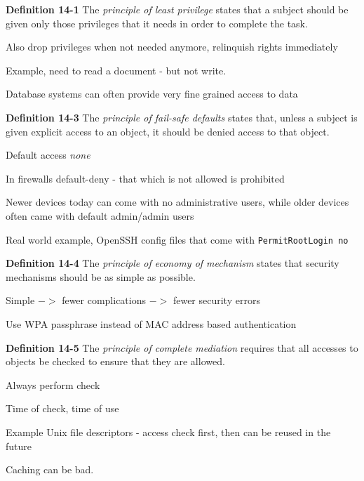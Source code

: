 \documentclass[Screen16to9,17pt]{foils}
\begin{document}

\begin{list1}
\item {\bf Definition 14-1} The \emph{principle of least privilege} states that a subject should be given only those privileges that it needs in order to complete the task.
\item Also drop privileges when not needed anymore, relinquish rights immediately
\item Example, need to read a document - but not write.
\item Database systems can often provide very fine grained access to data
\end{list1}



\begin{list1}
\item {\bf Definition 14-3} The \emph{principle of fail-safe defaults} states that, unless a subject is given explicit access to an object, it should be denied access to that object.
\item Default access \emph{none}
\item In firewalls default-deny - that which is not allowed is prohibited
\item Newer devices today can come with no administrative users, while older devices often came with default admin/admin users
\item Real world example, OpenSSH config files that come with \verb+PermitRootLogin no+
\end{list1}



\begin{list1}
\item {\bf Definition 14-4} The \emph{principle of economy of mechanism} states that security mechanisms should be as simple as possible.
\item Simple $->$ fewer complications $->$ fewer security errors
\item Use WPA passphrase instead of MAC address based authentication
\item
\end{list1}



\begin{list1}
\item {\bf Definition 14-5} The \emph{principle of complete mediation} requires that all accesses to objects be checked to ensure that they are allowed.
\item Always perform check
\item Time of check, time of use
\item Example Unix file descriptors - access check first, then can be reused in the future
\item Caching can be bad.
\end{list1}
\end{document}
